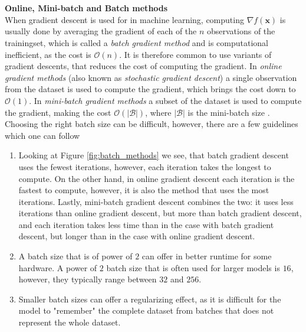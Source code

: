 \documentclass[main.tex]{subfiles}
\begin{document}
\\
\\
\noindent \textbf{Online, Mini-batch and Batch methods} \\
\noindent When gradient descent is used for in machine learning, computing $\nabla f(\bm{x})$ is usually done by averaging the gradient of each of the $n$ observations of the trainingset, which is called a \textit{batch gradient method} and is computational inefficient, as the cost is $\mathcal{O}(n)$. It is therefore common to use variants of gradient descents, that reduces the cost of computing the gradient. In \textit{online gradient methods} (also known as \textit{stochastic gradient descent}) a single observation from the dataset is used to compute the gradient, which brings the cost down to $\mathcal{O}(1)$. In \textit{mini-batch gradient methods} a subset of the dataset is used to compute the gradient, making the cost $\mathcal{O}(|\mathcal{B}|)$, where $|\mathcal{B}|$ is the mini-batch size \cite{d2l}. \\
Choosing the right batch size can be difficult, however, there are a few guidelines which one can follow \cite{EML_optimization} \cite{d2l}
\begin{enumerate}
    \item Looking at Figure \ref{fig:batch_methods} we see, that batch gradient descent uses the fewest iterations, however, each iteration takes the longest to compute. On the other hand, in online gradient descent each iteration is the fastest to compute, however, it is also the method that uses the most iterations. Lastly, mini-batch gradient descent combines the two: it uses less iterations than online gradient descent, but more than batch gradient descent, and each iteration takes less time than in the case with batch gradient descent, but longer than in the case with online gradient descent.
    \item A batch size that is of power of $2$ can offer in better runtime for some hardware. A power of $2$ batch size that is often used for larger models is $16$, however, they typically range between $32$ and $256$.
    \item Smaller batch sizes can offer a regularizing effect, as it is difficult for the model to "remember" the complete dataset from batches that does not represent the whole dataset.
\end{enumerate}
\end{document}
